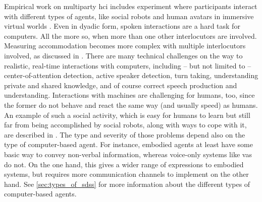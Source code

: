 Empirical work on multiparty \ac{hci} includes experiment where participants interact with different types of agents, like social robots \citep[as in][]{Foster2012two,Ibrahim2019fundamental} and human avatars in immersive virtual worlds \citep[e.g.,][]{Traum2002embodied}.
Even in dyadic form, spoken interactions are a hard task for computers.
All the more so, when more than one other interlocutors are involved.
Measuring accommodation becomes more complex with multiple interlocutors involved, as discussed in \citet{Rahimi2019acoustic}.
There are many technical challenges on the way to realistic, real-time interactions with computers, including -- but not limited to -- center-of-attention detection, active speaker detection, turn taking, understanding private and shared knowledge, and of course correct speech production and understanding.
Interactions with machines are challenging for humans, too, since the former do not behave and react the same way (and usually speed) as humans.
An example of such a social activity, which is easy for humans to learn but still far from being accomplished by social robots, along with ways to cope with it, are described in \citet{Jonel2018Farmi}.
The type and severity of those problems depend also on the type of computer-based agent.
For instance, embodied agents at least have some basic way to convey non-verbal information, whereas voice-only systems like \acp{va} do not.
On the one hand, this gives a wider range of expressions to embodied systems, but requires more communication channels to implement on the other hand.
See \cref{sec:types_of_sdss} for more information about the different types of computer-based agents.


